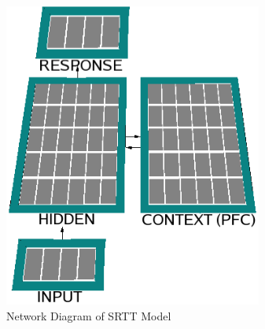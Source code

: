 
\begin{figure}[t]
\begin{center}
	\includegraphics[width=85mm]{figures/srtt_network.eps}
\end{center}
\caption{Network Diagram of SRTT Model} 
\label{network-diagram-srtt}
\end{figure}

